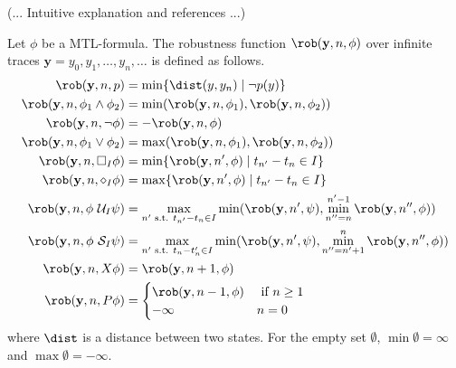 (... Intuitive explanation and references ...)
\begin{definition}[Robustness]
  Let $\phi$ be a MTL-formula.
  The robustness function $\rob(\mathbf{y}, n, \phi)$ over infinite traces $\mathbf{y} = y_0, y_1, \ldots, y_n, \ldots$ is defined as follows.
  \begin{align}
    \rob(\mathbf{y}, n, p) &= \min \{ \dist(y, y_n) \mid \neg p(y) \}\\
    \rob(\mathbf{y}, n, \phi_1 \wedge \phi_2) &= \min(\rob(\mathbf{y}, n, \phi_1), \rob(\mathbf{y}, n, \phi_2))\\
    \rob(\mathbf{y}, n, \neg \phi) &= - \rob(\mathbf{y}, n, \phi)\\
    \rob(\mathbf{y}, n, \phi_1 \vee \phi_2) &= \max(\rob(\mathbf{y}, n, \phi_1), \rob(\mathbf{y}, n, \phi_2))\\
    \rob(\mathbf{y}, n, \square_I \phi) &= \min \{ \rob(\mathbf{y}, n', \phi) \mid t_{n'} - t_n \in I \}\\
    \rob(\mathbf{y}, n, \diamond_I \phi) &= \max \{ \rob(\mathbf{y}, n', \phi) \mid t_{n'} - t_n \in I \}\\
    \rob(\mathbf{y}, n, \phi \ \mathcal{U}_I \psi) &= \max_{n' \text{ s.t. } t_{n'} - t_n \in I} \min(\rob(\mathbf{y}, n', \psi), \min_{n'' = n}^{n'-1} \rob(\mathbf{y}, n'', \phi))\\
    \rob(\mathbf{y}, n, \phi \ \mathcal{S}_I \psi) &= \max_{n' \text{ s.t. } t_{n} - t_n' \in I} \min(\rob(\mathbf{y}, n', \psi), \min_{n'' = n'+1}^{n} \rob(\mathbf{y}, n'', \phi))\\
    \rob(\mathbf{y}, n, X \phi) &= \rob(\mathbf{y}, n+1, \phi)\\
    \rob(\mathbf{y}, n, P \phi) &=
    \begin{cases}
        \rob(\mathbf{y}, n-1, \phi) & \text{ if } n \geq 1\\
        -\infty & n = 0
    \end{cases}
  \end{align}
  where $\dist$ is a distance between two states.
  For the empty set $\emptyset$, $\min \emptyset = \infty$ and $\max \emptyset = -\infty$.
\end{definition}


